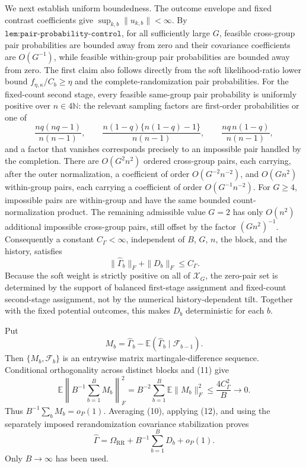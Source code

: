 We next establish uniform boundedness.  The outcome envelope and fixed contrast coefficients give \(\sup_{k,b}\|u_{k,b}\|<\infty\).  By \(\texttt{lem:pair-probability-control}\), for all sufficiently large \(G\), feasible cross-group pair probabilities are bounded away from zero and their covariance coefficients are \(O(G^{-1})\), while feasible within-group pair probabilities are bounded away from zero.  The first claim also follows directly from the soft likelihood-ratio lower bound \(f_{\eta,\kappa}/C_b\geq\eta\) and the complete-randomization pair probabilities.  For the fixed-count second stage, every feasible same-group pair probability is uniformly positive over \(n\in4\mathbb N\): the relevant sampling factors are first-order probabilities or one of
\[
 \frac{nq(nq-1)}{n(n-1)},\qquad
 \frac{n(1-q)\{n(1-q)-1\}}{n(n-1)},\qquad
 \frac{nq\,n(1-q)}{n(n-1)},
\]
and a factor that vanishes corresponds precisely to an impossible pair handled by the completion.  There are \(O(G^2n^2)\) ordered cross-group pairs, each carrying, after the outer normalization, a coefficient of order \(O(G^{-2}n^{-2})\), and \(O(Gn^2)\) within-group pairs, each carrying a coefficient of order \(O(G^{-1}n^{-2})\).  For \(G\geq4\), impossible pairs are within-group and have the same bounded count-normalization product.  The remaining admissible value \(G=2\) has only \(O(n^2)\) additional impossible cross-group pairs, still offset by the factor \((Gn^2)^{-1}\).  Consequently a constant \(C_\Gamma<\infty\), independent of \(B\), \(G\), \(n\), the block, and the history, satisfies
\[
 \|\widehat\Gamma_b\|_F+\|D_b\|_F\leq C_\Gamma.           \tag{11}
\]
Because the soft weight is strictly positive on all of \(\mathcal X_G\), the zero-pair set is determined by the support of balanced first-stage assignment and fixed-count second-stage assignment, not by the numerical history-dependent tilt.  Together with the fixed potential outcomes, this makes \(D_b\) deterministic for each \(b\).

Put
\[
 M_b=\widehat\Gamma_b-
     \mathbb E(\widehat\Gamma_b\mid\mathcal F_{b-1}).
\]
Then \(\{M_b,\mathcal F_b\}\) is an entrywise matrix martingale-difference sequence.  Conditional orthogonality across distinct blocks and (11) give
\[
 \mathbb E\left\|B^{-1}\sum_{b=1}^BM_b\right\|_F^2
 =B^{-2}\sum_{b=1}^B\mathbb E\|M_b\|_F^2
 \leq\frac{4C_\Gamma^2}{B}\longrightarrow0.                \tag{12}
\]
Thus \(B^{-1}\sum_bM_b=o_P(1)\).  Averaging (10), applying (12), and using the separately imposed rerandomization covariance stabilization proves
\[
 \widehat\Gamma
 =\Omega_{\mathrm{RR}}+B^{-1}\sum_{b=1}^BD_b+o_P(1).       \tag{13}
\]
Only \(B\to\infty\) has been used.


